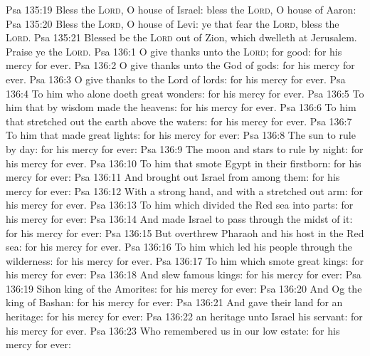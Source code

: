 \vs Psa 135:19 Bless the \textsc{Lord}, O house of Israel: bless the \textsc{Lord}, O house of Aaron:
\vs Psa 135:20 Bless the \textsc{Lord}, O house of Levi: ye that fear the \textsc{Lord}, bless the \textsc{Lord}.
\vs Psa 135:21 Blessed be the \textsc{Lord} out of Zion, which dwelleth at Jerusalem. Praise ye the \textsc{Lord}.
\vs Psa 136:1 O give thanks unto the \textsc{Lord}; for  good: for his mercy  for ever.
\vs Psa 136:2 O give thanks unto the God of gods: for his mercy  for ever.
\vs Psa 136:3 O give thanks to the Lord of lords: for his mercy  for ever.
\vs Psa 136:4 To him who alone doeth great wonders: for his mercy  for ever.
\vs Psa 136:5 To him that by wisdom made the heavens: for his mercy  for ever.
\vs Psa 136:6 To him that stretched out the earth above the waters: for his mercy  for ever.
\vs Psa 136:7 To him that made great lights: for his mercy  for ever:
\vs Psa 136:8 The sun to rule by day: for his mercy  for ever:
\vs Psa 136:9 The moon and stars to rule by night: for his mercy  for ever.
\vs Psa 136:10 To him that smote Egypt in their firstborn: for his mercy  for ever:
\vs Psa 136:11 And brought out Israel from among them: for his mercy  for ever:
\vs Psa 136:12 With a strong hand, and with a stretched out arm: for his mercy  for ever.
\vs Psa 136:13 To him which divided the Red sea into parts: for his mercy  for ever:
\vs Psa 136:14 And made Israel to pass through the midst of it: for his mercy  for ever:
\vs Psa 136:15 But overthrew Pharaoh and his host in the Red sea: for his mercy  for ever.
\vs Psa 136:16 To him which led his people through the wilderness: for his mercy  for ever.
\vs Psa 136:17 To him which smote great kings: for his mercy  for ever:
\vs Psa 136:18 And slew famous kings: for his mercy  for ever:
\vs Psa 136:19 Sihon king of the Amorites: for his mercy  for ever:
\vs Psa 136:20 And Og the king of Bashan: for his mercy  for ever:
\vs Psa 136:21 And gave their land for an heritage: for his mercy  for ever:
\vs Psa 136:22  an heritage unto Israel his servant: for his mercy  for ever.
\vs Psa 136:23 Who remembered us in our low estate: for his mercy  for ever:
